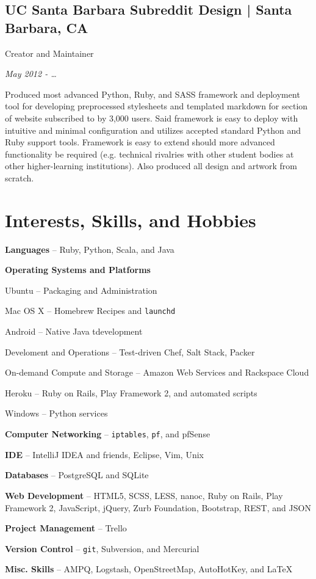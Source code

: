 \documentclass[10pt, letter]{article}
\newcommand{\years}[1]{\marginnote{#1}}
\renewcommand{\years}[1]{{\emph{#1}}}
\newenvironment{packed_item}{
\begin{itemize}
  \setlength{\itemsep}{1pt}
  \setlength{\parskip}{0pt}
  \setlength{\parsep}{0pt}
}{\end{itemize}}
\begin{document}
\begin{multicols}{2}
\subsection*{UC Santa Barbara Subreddit Design | {\footnotesize{Santa Barbara, CA}}}

Creator and Maintainer

\years{May 2012 - \ldots}

Produced most advanced Python, Ruby, and SASS framework and deployment tool for
developing preprocessed stylesheets and templated markdown for section of
website subscribed to by 3,000 users. Said framework is easy to deploy with
intuitive and minimal configuration and utilizes accepted standard Python and
Ruby support tools. Framework is easy to extend should more advanced
functionality be required (e.g. technical rivalries with other student bodies
at other higher-learning institutions). Also produced all design and artwork
from scratch.

\section*{Interests, Skills, and Hobbies}

\begin{packed_item}
    \item \textbf{Languages} -- Ruby, Python, Scala, and Java
    \item \textbf{Operating Systems and Platforms}
        \begin{packed_item}
            \item Ubuntu -- Packaging and Administration
            \item Mac OS X -- Homebrew Recipes and \texttt{launchd}
            \item Android -- Native Java tdevelopment
            \item Develoment and Operations -- Test-driven Chef, Salt Stack, Packer
            \item On-demand Compute and Storage -- Amazon Web Services and Rackspace Cloud
            \item Heroku -- Ruby on Rails, Play Framework 2, and automated scripts
            \item Windows -- Python services
        \end{packed_item}
    \item \textbf{Computer Networking} -- \texttt{iptables}, \texttt{pf}, and pfSense
    \item \textbf{IDE} -- IntelliJ IDEA and friends, Eclipse, Vim, Unix
    \item \textbf{Databases} -- PostgreSQL and SQLite
    \item \textbf{Web Development} -- HTML5, SCSS, LESS, nanoc, Ruby on Rails, Play Framework 2, JavaScript, jQuery, Zurb Foundation, Bootstrap, REST, and JSON
    \item \textbf{Project Management} -- Trello
    \item \textbf{Version Control} -- \texttt{git}, Subversion, and Mercurial
    \item \textbf{Misc. Skills} -- AMPQ, Logstash, OpenStreetMap, AutoHotKey, and \LaTeX
\end{packed_item}


\end{multicols}
\end{document}
